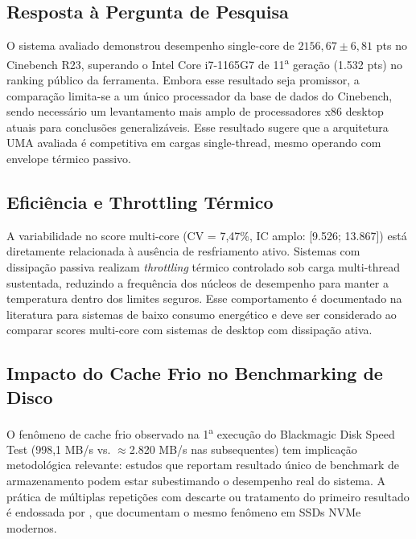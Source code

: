 \documentclass[12pt]{article}
\begin{document}
\subsection{Resposta \`a Pergunta de Pesquisa}

O sistema avaliado demonstrou desempenho single-core de $2156{,}67 \pm 6{,}81$
pts no Cinebench R23, superando o Intel Core i7-1165G7 de
11\textsuperscript{a} gera\c{c}\~ao (1.532 pts) no ranking p\'ublico da
ferramenta. Embora esse resultado seja promissor, a compara\c{c}\~ao
limita-se a um \'unico processador da base de dados do Cinebench, sendo
necess\'ario um levantamento mais amplo de processadores x86 desktop atuais
para conclus\~oes generaliz\'aveis.
Esse resultado sugere que a arquitetura UMA avaliada \'e competitiva em cargas
single-thread, mesmo operando com envelope t\'ermico passivo.

\subsection{Efici\^encia e Throttling T\'ermico}

A variabilidade no score multi-core (CV = 7,47\%, IC amplo: [9.526; 13.867])
est\'a diretamente relacionada \`a aus\^encia de resfriamento ativo. Sistemas
com dissipa\c{c}\~ao passiva realizam \textit{throttling} t\'ermico controlado
sob carga multi-thread sustentada, reduzindo a frequ\^encia dos n\'ucleos de
desempenho para manter a temperatura dentro dos limites seguros. Esse
comportamento \'e documentado na literatura para sistemas de baixo consumo
energ\'etico \cite{hennessy2017computer} e deve ser considerado ao comparar
scores multi-core com sistemas de desktop com dissipa\c{c}\~ao ativa.

\subsection{Impacto do Cache Frio no Benchmarking de Disco}

O fen\^omeno de cache frio observado na 1\textsuperscript{a} execu\c{c}\~ao
do Blackmagic Disk Speed Test (998,1 MB/s vs. $\approx$2.820 MB/s nas
subsequentes) tem implica\c{c}\~ao metodol\'ogica relevante: estudos que
reportam resultado \'unico de benchmark de armazenamento podem estar
subestimando o desempenho real do sistema. A pr\'atica de m\'ultiplas
repeti\c{c}\~oes com descarte ou tratamento do primeiro resultado \'e
endossada por \cite{yang2020empirical}, que documentam o mesmo fen\^omeno em
SSDs NVMe modernos.
\end{document}
